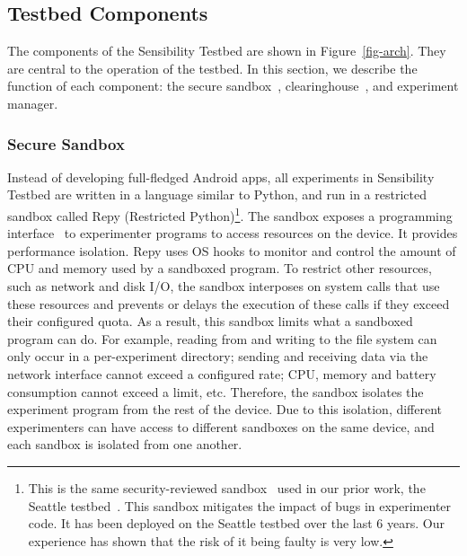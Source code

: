 \subsection{Testbed Components}\label{sec-component}

The components of the Sensibility Testbed are shown in Figure~\ref{fig-arch}.
They are central to the operation of the testbed. 
In this section, we describe the function of each component: the
secure sandbox~\cite{cappos2010retaining}, clearinghouse~\cite{ch}, 
and experiment manager.

\subsubsection{Secure Sandbox}\label{sec-repy}

Instead of developing full-fledged Android apps, all 
experiments in Sensibility Testbed are written in a language
similar to Python, and run in a restricted %
sandbox called Repy (Restricted Python)\footnote{\scriptsize This is the 
same security-reviewed sandbox~\cite{cappos2010retaining} used in
our prior work, the Seattle testbed~\cite{seattle}. This sandbox
mitigates the impact of bugs in experimenter code. It
has been deployed on the Seattle testbed over the last 6 years.
Our experience has shown that the risk of it being faulty is
very low.}. The sandbox exposes a programming 
interface~\cite{repyv2} to experimenter programs to access 
resources on the device. It provides performance isolation.
Repy uses OS hooks to monitor and control the amount of 
CPU and memory used by a sandboxed program. To restrict 
other resources, such as network and disk I/O, the sandbox 
interposes on system calls that use these resources and 
prevents or delays the execution of these calls if they exceed 
their configured quota. As a result, this sandbox limits 
what a sandboxed program can do. For example, reading from and writing to the file system can
only occur in a per-experiment directory; sending and receiving
data via the network interface cannot exceed a configured rate;
CPU, memory and battery consumption cannot exceed a limit, etc.
Therefore, the sandbox isolates the experiment program from 
the rest of the device. Due to this isolation, different experimenters
can have access to different sandboxes on the same device,
and each sandbox is isolated from one another.


